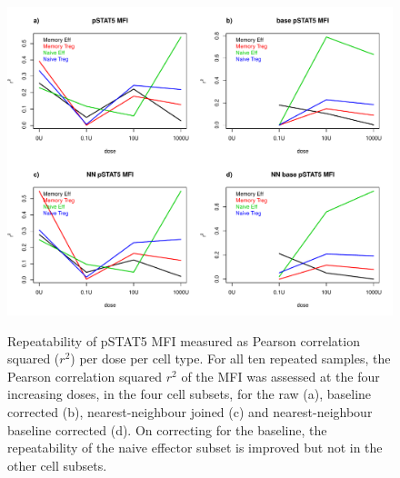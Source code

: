 \begin{figure}
\centering
\begin{minipage}{.8\textwidth}
\includegraphics[width=\linewidth]{figures/repeatability-PSTAT5-MFI}
\end{minipage}
{
  Repeatability of pSTAT5 MFI measured as Pearson correlation squared ($r^2$) per dose per cell type.
}
{
  For all ten repeated samples, the Pearson correlation squared $r^2$ of the MFI was assessed at the four increasing doses, in the four cell subsets, for the raw (a), baseline corrected (b), nearest-neighbour joined (c) and nearest-neighbour baseline corrected (d).
  On correcting for the baseline, the repeatability of the naive effector subset is improved but not in the other cell subsets.
} 
\end{figure}
